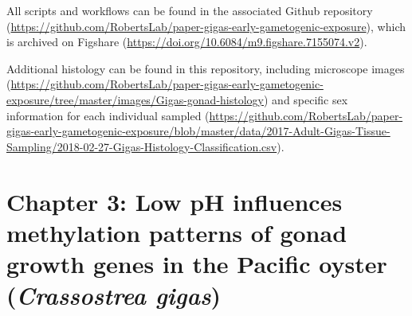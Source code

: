 \documentclass [11pt, proquest] {uwthesis}[2015/03/03]
\begin{document}
All scripts and workflows can be found in the associated Github repository (\url{https://github.com/RobertsLab/paper-gigas-early-gametogenic-exposure}), which is archived on Figshare (\url{https://doi.org/10.6084/m9.figshare.7155074.v2}).

Additional histology can be found in this repository, including microscope images (\url{https://github.com/RobertsLab/paper-gigas-early-gametogenic-exposure/tree/master/images/Gigas-gonad-histology}) and specific sex information for each individual sampled (\url{https://github.com/RobertsLab/paper-gigas-early-gametogenic-exposure/blob/master/data/2017-Adult-Gigas-Tissue-Sampling/2018-02-27-Gigas-Histology-Classification.csv}).

\hypertarget{chapter-3-low-ph-influences-methylation-patterns-of-gonad-growth-genes-in-the-pacific-oyster-crassostrea-gigas}{%
\section{\texorpdfstring{Chapter 3: Low pH influences methylation patterns of gonad growth genes in the Pacific oyster (\emph{Crassostrea gigas})}{Chapter 3: Low pH influences methylation patterns of gonad growth genes in the Pacific oyster (Crassostrea gigas)}}\label{chapter-3-low-ph-influences-methylation-patterns-of-gonad-growth-genes-in-the-pacific-oyster-crassostrea-gigas}}
\end{document}
